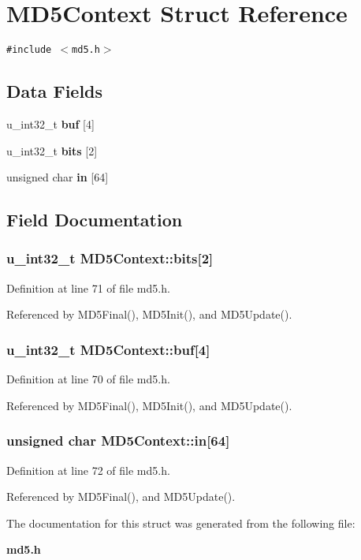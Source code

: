 \section{MD5Context Struct Reference}
\label{structMD5Context}
{\tt \#include $<$md5.h$>$}

\subsection*{Data Fields}
\begin{CompactItemize}
\item 
u\_\-int32\_\-t {\bf buf} [4]
\item 
u\_\-int32\_\-t {\bf bits} [2]
\item 
unsigned char {\bf in} [64]
\end{CompactItemize}


\subsection{Field Documentation}
\subsubsection{\setlength{\rightskip}{0pt plus 5cm}u\_\-int32\_\-t {\bf MD5Context::bits}[2]}\label{structMD5Context_o1}




Definition at line 71 of file md5.h.

Referenced by MD5Final(), MD5Init(), and MD5Update().
\subsubsection{\setlength{\rightskip}{0pt plus 5cm}u\_\-int32\_\-t {\bf MD5Context::buf}[4]}\label{structMD5Context_o0}




Definition at line 70 of file md5.h.

Referenced by MD5Final(), MD5Init(), and MD5Update().
\subsubsection{\setlength{\rightskip}{0pt plus 5cm}unsigned char {\bf MD5Context::in}[64]}\label{structMD5Context_o2}




Definition at line 72 of file md5.h.

Referenced by MD5Final(), and MD5Update().

The documentation for this struct was generated from the following file:\begin{CompactItemize}
\item 
{\bf md5.h}\end{CompactItemize}
